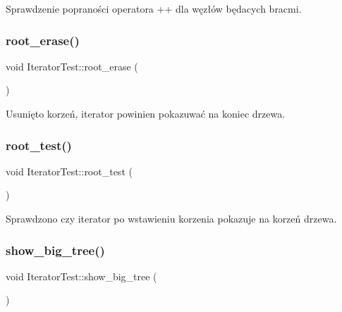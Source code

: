 Sprawdzenie popraności operatora ++ dla węzłów będacych bracmi. \mbox{\label{class_iterator_test_a4defa697edd8ac31231e2f437f5b01e5}} 
\subsubsection{\texorpdfstring{root\+\_\+erase()}{root\_erase()}}
{\footnotesize\ttfamily void Iterator\+Test\+::root\+\_\+erase (\begin{DoxyParamCaption}{ }\end{DoxyParamCaption})\hspace{0.3cm}{\ttfamily [inline]}}

Usunięto korzeń, iterator powinien pokazuwać na koniec drzewa. \mbox{\label{class_iterator_test_a9a97bde928f26d4482c1f422dff08b1e}} 
\subsubsection{\texorpdfstring{root\+\_\+test()}{root\_test()}}
{\footnotesize\ttfamily void Iterator\+Test\+::root\+\_\+test (\begin{DoxyParamCaption}{ }\end{DoxyParamCaption})\hspace{0.3cm}{\ttfamily [inline]}}

Sprawdzono czy iterator po wstawieniu korzenia pokazuje na korzeń drzewa. \mbox{\label{class_iterator_test_aa784f81f7305266da516fb9c91760442}} 
\subsubsection{\texorpdfstring{show\+\_\+big\+\_\+tree()}{show\_big\_tree()}}
{\footnotesize\ttfamily void Iterator\+Test\+::show\+\_\+big\+\_\+tree (\begin{DoxyParamCaption}{ }\end{DoxyParamCaption})\hspace{0.3cm}{\ttfamily [inline]}}

